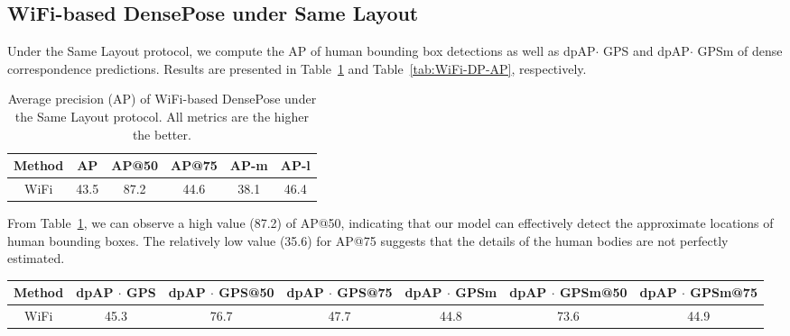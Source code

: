 \documentclass[sigconf, anonymous=false]{acmart}
\newcommand{\dong}[1]{\textcolor{green}{[Dong: #1]}}
\begin{document}

\subsection{WiFi-based DensePose under Same Layout}

Under the Same Layout protocol, we compute the AP of human bounding box detections as well as dpAP$\cdot$ GPS and dpAP$\cdot$ GPSm of dense correspondence predictions. Results are presented in Table~\ref{tab:WiFi-AP} and Table~\ref{tab:WiFi-DP-AP}, respectively.

\begin{table}[!htb]
\begin{center}
\begin{tabular}{ |c|c|c|c|c|c| } 
 \hline
 Method & AP & AP@50 & AP@75 & AP-m & AP-l \\ 
 \hline
 WiFi & 43.5 & 87.2 & 44.6 & 38.1 & 46.4\\ 
 \hline
\end{tabular}
\end{center}
\caption{Average precision (AP) of WiFi-based DensePose under the Same Layout protocol. All metrics are the higher the better.}
\label{tab:WiFi-AP}
\end{table}



From Table~\ref{tab:WiFi-AP}, we can observe a high value (87.2) of AP@50, indicating that our model can effectively detect the approximate locations of human bounding boxes. The relatively low value (35.6) for AP@75 suggests that the details of the human bodies are not perfectly estimated.


\begin{table*}[!htb]
\begin{center}
\begin{tabular}{ |c|c|c|c|c|c|c| } 
 \hline
 Method & dpAP $\cdot$ GPS & dpAP $\cdot$ GPS@50 & dpAP $\cdot$ GPS@75 & dpAP $\cdot$ GPSm & dpAP $\cdot$ GPSm@50 & dpAP $\cdot$ GPSm@75 \\ 
 \hline
 WiFi &  45.3 & 76.7 & 47.7 & 44.8 & 73.6 & 44.9\\ 
 \hline
\end{tabular}
\end{center}
\caption{DensePose Average precision (dpAP $\cdot$ GPS, dpAP $\cdot$ GPSm) of WiFi-based DensePose under the Same Layout protocol. All metrics are the higher the better.}
\label{tab:WiFi-DP-AP}
\end{table*}
\end{document}
